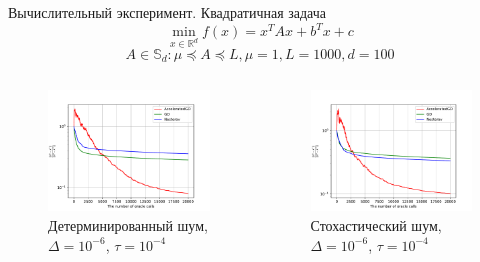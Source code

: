\documentclass{beamer}
\begin{document}
\begin{frame}{Вычислительный эксперимент. Квадратичная задача}
$$\min\limits_{x \in \mathbb{R}^d} f(x) = x^T A x + b^T x + c$$
$$A \in \mathbb{S}_d: \mu \preceq A \preceq L, \mu = 1, L = 1000, d = 100$$
\begin{columns}[c]
    \begin{figure}
    \includegraphics[width=1.0\textwidth]{Deterministic_quadratic_AGD_GD_Nesterov_18.pdf}
        \caption*{Детерминированный шум, $\Delta = 10^{-6}$, $\tau = 10^{-4}$}
    \end{figure}

    \begin{figure}
    \includegraphics[width=1.0\textwidth]{Stochastic_quadratic_AGD_GD_Nesterov_18.pdf}
        \caption*{Стохастический шум, $\Delta = 10^{-6}$, $\tau = 10^{-4}$}
    \end{figure}
\end{columns}
\end{frame}
\end{document}
